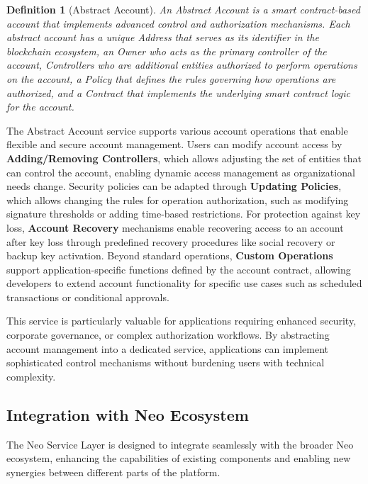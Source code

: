 \documentclass[12pt,a4paper]{article}
\newtheorem{definition}{Definition}
\begin{document}
\begin{definition}[Abstract Account]
An Abstract Account is a smart contract-based account that implements advanced control and authorization mechanisms. Each abstract account has a unique Address that serves as its identifier in the blockchain ecosystem, an Owner who acts as the primary controller of the account, Controllers who are additional entities authorized to perform operations on the account, a Policy that defines the rules governing how operations are authorized, and a Contract that implements the underlying smart contract logic for the account.
\end{definition}

The Abstract Account service supports various account operations that enable flexible and secure account management. Users can modify account access by \textbf{Adding/Removing Controllers}, which allows adjusting the set of entities that can control the account, enabling dynamic access management as organizational needs change. Security policies can be adapted through \textbf{Updating Policies}, which allows changing the rules for operation authorization, such as modifying signature thresholds or adding time-based restrictions. For protection against key loss, \textbf{Account Recovery} mechanisms enable recovering access to an account after key loss through predefined recovery procedures like social recovery or backup key activation. Beyond standard operations, \textbf{Custom Operations} support application-specific functions defined by the account contract, allowing developers to extend account functionality for specific use cases such as scheduled transactions or conditional approvals.

This service is particularly valuable for applications requiring enhanced security, corporate governance, or complex authorization workflows. By abstracting account management into a dedicated service, applications can implement sophisticated control mechanisms without burdening users with technical complexity.

\subsection{Integration with Neo Ecosystem}
\label{subsec:nsl-integration}

The Neo Service Layer is designed to integrate seamlessly with the broader Neo ecosystem, enhancing the capabilities of existing components and enabling new synergies between different parts of the platform.
\end{document}
